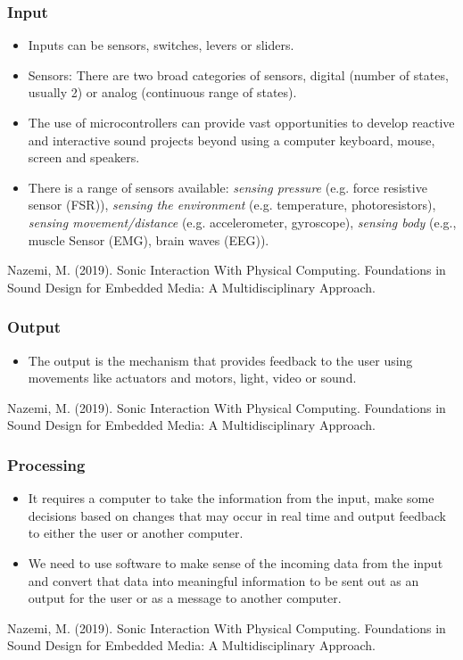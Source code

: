 \documentclass[screen, aspectratio=169]{beamer}
\begin{document}
\begin{frame}
\frametitle{Input}
\begin{itemize}
\item Inputs can be sensors, switches, levers or sliders.
\item Sensors: There are two broad categories of sensors, digital (number of states, usually 2) or analog (continuous range of states). 
\item The use of microcontrollers can provide vast opportunities to develop reactive and interactive sound projects beyond using a computer keyboard, mouse, screen and speakers.
\item There is a range of sensors available: \emph{sensing pressure} (e.g. force resistive sensor (FSR)), \emph{sensing the environment} (e.g. temperature, photoresistors), \emph{sensing movement/distance} (e.g. accelerometer, gyroscope), \emph{sensing body} (e.g., muscle Sensor (EMG), brain waves (EEG)).
\end{itemize}
{\tiny
Nazemi, M. (2019). Sonic Interaction With Physical Computing. Foundations in Sound Design for Embedded Media: A Multidisciplinary Approach. \cite{Nazemi.2019.SID}
}	
\end{frame}
%
\begin{frame}
\frametitle{Output}
\begin{itemize}
\item The output is the mechanism that provides feedback to the user using movements like actuators and motors, light, video or sound. 
\end{itemize}
{\tiny
Nazemi, M. (2019). Sonic Interaction With Physical Computing. Foundations in Sound Design for Embedded Media: A Multidisciplinary Approach. \cite{Nazemi.2019.SID}
}	
\end{frame}
%
\begin{frame}
\frametitle{Processing}
\begin{itemize}
\item It requires a computer to take the information from the input, make some decisions based on changes that may occur in real time and output feedback to either the user or another computer. 
\item We need to use software to make sense of the incoming data from the input and convert that data into meaningful information to be sent out as an output for the user or as a message to another computer. 
\end{itemize}
%
{\tiny
Nazemi, M. (2019). Sonic Interaction With Physical Computing. Foundations in Sound Design for Embedded Media: A Multidisciplinary Approach. \cite{Nazemi.2019.SID}
}	
%
\end{frame}
\end{document}
